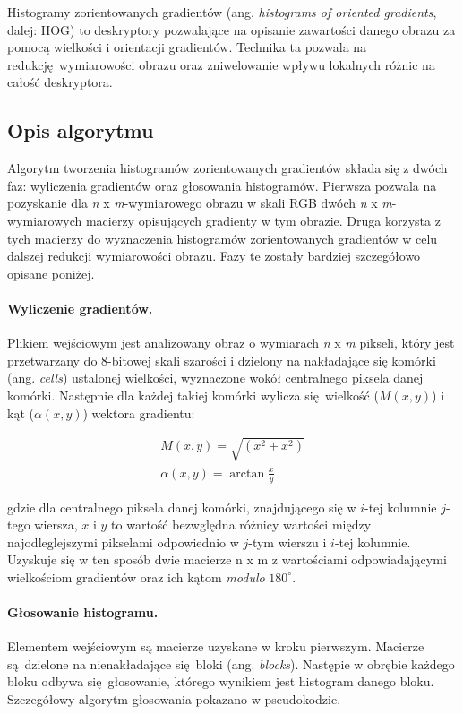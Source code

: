 \documentclass[12pt,a4paper,leqno,oneside,titlepage]{book}
\begin{document}
Histogramy zorientowanych gradientów (ang. \textit{histograms of oriented gradients}, dalej: HOG) to deskryptory pozwalające na opisanie zawartości danego obrazu za pomocą wielkości i orientacji gradientów. Technika ta pozwala na redukcję wymiarowości obrazu oraz zniwelowanie wpływu lokalnych różnic na całość deskryptora.\cite{DalalTriggs05Hog}

\subsection{Opis algorytmu}
Algorytm tworzenia histogramów zorientowanych gradientów składa się z dwóch faz: wyliczenia gradientów oraz głosowania histogramów. Pierwsza pozwala na pozyskanie dla \textit{n} x \textit{m}-wymiarowego obrazu w skali RGB dwóch \textit{n} x \textit{m}-wymiarowych macierzy opisujących gradienty w tym obrazie. Druga korzysta z tych macierzy do wyznaczenia histogramów zorientowanych gradientów w celu dalszej redukcji wymiarowości obrazu. Fazy te zostały bardziej szczegółowo opisane poniżej.

\paragraph{Wyliczenie gradientów.}
Plikiem wejściowym jest analizowany obraz o wymiarach \textit{n} x \textit{m} pikseli, który jest przetwarzany do 8-bitowej skali szarości i dzielony na nakładające się komórki (ang. \textit{cells}) ustalonej wielkości, wyznaczone wokół centralnego piksela danej komórki. Następnie dla każdej takiej komórki wylicza się wielkość ($M(x,y)$) i kąt ($\alpha(x,y)$) wektora gradientu:

\begin{align}
M(x,y) = \sqrt{\left( x^{2}+x^{2}\right)} \\
\alpha(x,y) = \arctan{\frac{x}{y}}
\end{align}

gdzie dla centralnego piksela danej komórki, znajdującego się w $i$-tej kolumnie $j$-tego wiersza, $x$ i $y$ to wartość bezwględna różnicy wartości między najodleglejszymi pikselami odpowiednio w $j$-tym wierszu i $i$-tej kolumnie. Uzyskuje się w ten sposób dwie macierze n x m z wartościami odpowiadającymi wielkościom gradientów oraz ich kątom \textit{modulo} $180^\circ$.\cite{dpi2008}

\paragraph{Głosowanie histogramu.}
Elementem wejściowym są macierze uzyskane w kroku pierwszym. Macierze są dzielone na nienakładające się bloki (ang. \textit{blocks}). Następie w obrębie każdego bloku odbywa się głosowanie, którego wynikiem jest histogram danego bloku. Szczegółowy algorytm głosowania pokazano w pseudokodzie.
\end{document}
